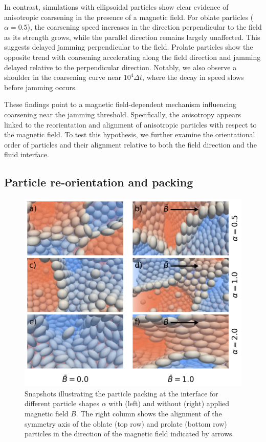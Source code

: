 In contrast, simulations with ellipsoidal particles show clear evidence of anisotropic coarsening in the presence of a magnetic field. For oblate 
particles (\(\alpha = 0.5\)), the coarsening speed increases in the direction perpendicular to the field as its strength grows, while the parallel 
direction remains largely unaffected. This suggests delayed jamming perpendicular to the field. Prolate particles show the opposite trend with coarsening 
accelerating along the field direction and jamming delayed relative to the perpendicular direction. Notably, we also observe a shoulder in the coarsening 
curve near \(10^4 \Delta t\), where the decay in speed slows before jamming occurs. 
    
These findings point to a magnetic field-dependent mechanism influencing coarsening near the jamming threshold. Specifically, the anisotropy appears 
linked to the reorientation and alignment of anisotropic particles with respect to the magnetic field. To test this hypothesis, we further examine the 
orientational order of particles and their alignment relative to both the field direction and the fluid interface.
    
\subsection{Particle re-orientation and packing}
    
    \begin{figure}
    \centering
    \includegraphics[scale=0.6]{../figures/results/paper1/particle_packing_viz.png}
    \caption{Snapshots illustrating the particle packing at the interface for different particle shapes $\alpha$ with (left)
     and without (right) applied magnetic field $\bar{B}$. The right column shows the alignment of the symmetry axis of the oblate (top row) and prolate (bottom row) 
     particles in the direction of the magnetic field indicated by arrows.}
    \label{fig:packing_viz}
    \end{figure}
    
